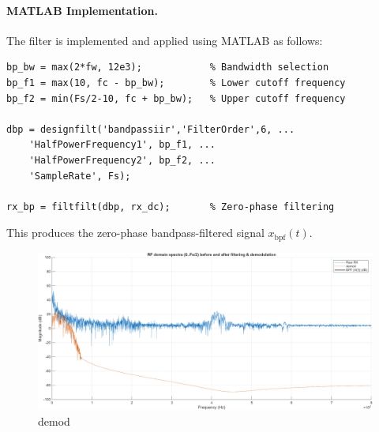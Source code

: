 \documentclass[10pt]{article}
\begin{document}
\paragraph{MATLAB Implementation.}
The filter is implemented and applied using MATLAB as follows:

\begin{lstlisting}
bp_bw = max(2*fw, 12e3);            % Bandwidth selection
bp_f1 = max(10, fc - bp_bw);        % Lower cutoff frequency
bp_f2 = min(Fs/2-10, fc + bp_bw);   % Upper cutoff frequency

dbp = designfilt('bandpassiir','FilterOrder',6, ...
    'HalfPowerFrequency1', bp_f1, ...
    'HalfPowerFrequency2', bp_f2, ...
    'SampleRate', Fs);

rx_bp = filtfilt(dbp, rx_dc);       % Zero-phase filtering
\end{lstlisting}

This produces the zero-phase bandpass-filtered signal $x_{\mathrm{bpf}}(t)$.


\begin{figure}[!h]
	\centering 
		\includegraphics[width = .75\columnwidth]{fig/100_fdomain_demod.png}	
	\caption{demod}
\label{fig:demod}
\end{figure}


\appendix{}


\end{document}
